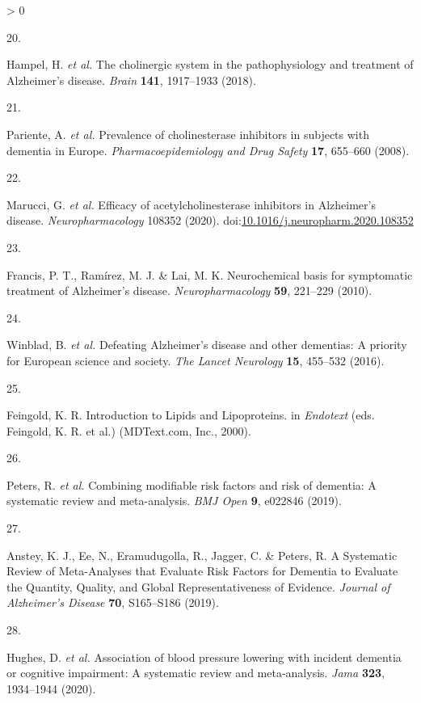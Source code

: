 \documentclass[a4paper, twoside]{templates/ociamthesis}
\newlength{\cslhangindent}
\newlength{\csllabelwidth}
\newenvironment{CSLReferences}[3] %
 {%
  \setlength{\parindent}{0pt}
  \ifodd #1 \everypar{\setlength{\hangindent}{\cslhangindent}}\ignorespaces\fi
  \ifnum #2 > 0
  \setlength{\parskip}{#2\baselineskip}
  \fi
 }%
 {}
\newcommand{\CSLLeftMargin}[1]{\parbox[t]{\maxof{\widthof{#1}}{\csllabelwidth}}{#1}}
\newcommand{\CSLRightInline}[1]{\parbox[t]{\linewidth - \csllabelwidth}{#1}}
\begin{document}
\begin{CSLReferences}{0}{0}
\leavevmode\hypertarget{ref-hampel2018}{}%
\CSLLeftMargin{20. }
\CSLRightInline{Hampel, H. \emph{et al.} The cholinergic system in the pathophysiology and treatment of {Alzheimer}'s disease. \emph{Brain} \textbf{141}, 1917--1933 (2018).}

\leavevmode\hypertarget{ref-pariente2008}{}%
\CSLLeftMargin{21. }
\CSLRightInline{Pariente, A. \emph{et al.} Prevalence of cholinesterase inhibitors in subjects with dementia in {Europe}. \emph{Pharmacoepidemiology and Drug Safety} \textbf{17}, 655--660 (2008).}

\leavevmode\hypertarget{ref-marucci2020}{}%
\CSLLeftMargin{22. }
\CSLRightInline{Marucci, G. \emph{et al.} Efficacy of acetylcholinesterase inhibitors in {Alzheimer}'s disease. \emph{Neuropharmacology} 108352 (2020). doi:\href{https://doi.org/10.1016/j.neuropharm.2020.108352}{10.1016/j.neuropharm.2020.108352}}

\leavevmode\hypertarget{ref-francis2010}{}%
\CSLLeftMargin{23. }
\CSLRightInline{Francis, P. T., Ramírez, M. J. \& Lai, M. K. Neurochemical basis for symptomatic treatment of {Alzheimer}'s disease. \emph{Neuropharmacology} \textbf{59}, 221--229 (2010).}

\leavevmode\hypertarget{ref-winblad2016}{}%
\CSLLeftMargin{24. }
\CSLRightInline{Winblad, B. \emph{et al.} Defeating {Alzheimer}'s disease and other dementias: A priority for {European} science and society. \emph{The Lancet Neurology} \textbf{15}, 455--532 (2016).}

\leavevmode\hypertarget{ref-feingold2000}{}%
\CSLLeftMargin{25. }
\CSLRightInline{Feingold, K. R. Introduction to {Lipids} and {Lipoproteins}. in \emph{Endotext} (eds. Feingold, K. R. et al.) ({MDText.com, Inc.}, 2000).}

\leavevmode\hypertarget{ref-peters2019}{}%
\CSLLeftMargin{26. }
\CSLRightInline{Peters, R. \emph{et al.} Combining modifiable risk factors and risk of dementia: A systematic review and meta-analysis. \emph{BMJ Open} \textbf{9}, e022846 (2019).}

\leavevmode\hypertarget{ref-anstey2019}{}%
\CSLLeftMargin{27. }
\CSLRightInline{Anstey, K. J., Ee, N., Eramudugolla, R., Jagger, C. \& Peters, R. A {Systematic Review} of {Meta}-{Analyses} that {Evaluate Risk Factors} for {Dementia} to {Evaluate} the {Quantity}, {Quality}, and {Global Representativeness} of {Evidence}. \emph{Journal of Alzheimer's Disease} \textbf{70}, S165--S186 (2019).}

\leavevmode\hypertarget{ref-hughes2020}{}%
\CSLLeftMargin{28. }
\CSLRightInline{Hughes, D. \emph{et al.} Association of blood pressure lowering with incident dementia or cognitive impairment: A systematic review and meta-analysis. \emph{Jama} \textbf{323}, 1934--1944 (2020).}


\end{CSLReferences}
\end{document}
